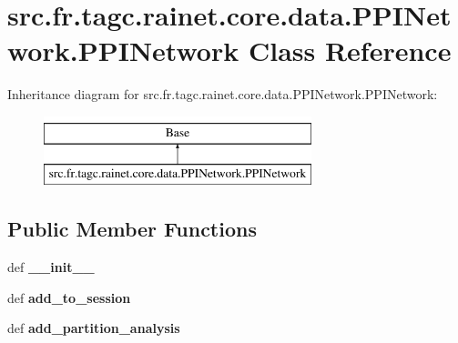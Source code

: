 \hypertarget{classsrc_1_1fr_1_1tagc_1_1rainet_1_1core_1_1data_1_1PPINetwork_1_1PPINetwork}{\section{src.\-fr.\-tagc.\-rainet.\-core.\-data.\-P\-P\-I\-Network.\-P\-P\-I\-Network Class Reference}
\label{classsrc_1_1fr_1_1tagc_1_1rainet_1_1core_1_1data_1_1PPINetwork_1_1PPINetwork}
}
Inheritance diagram for src.\-fr.\-tagc.\-rainet.\-core.\-data.\-P\-P\-I\-Network.\-P\-P\-I\-Network\-:\begin{figure}[H]
\begin{center}
\leavevmode
\includegraphics[height=2.000000cm]{classsrc_1_1fr_1_1tagc_1_1rainet_1_1core_1_1data_1_1PPINetwork_1_1PPINetwork}
\end{center}
\end{figure}
\subsection*{Public Member Functions}
\begin{DoxyCompactItemize}
\item 
\hypertarget{classsrc_1_1fr_1_1tagc_1_1rainet_1_1core_1_1data_1_1PPINetwork_1_1PPINetwork_ad16e66af14274e15cb1096a83fd7d6a4}{def {\bfseries \-\_\-\-\_\-init\-\_\-\-\_\-}}\label{classsrc_1_1fr_1_1tagc_1_1rainet_1_1core_1_1data_1_1PPINetwork_1_1PPINetwork_ad16e66af14274e15cb1096a83fd7d6a4}

\item 
\hypertarget{classsrc_1_1fr_1_1tagc_1_1rainet_1_1core_1_1data_1_1PPINetwork_1_1PPINetwork_a58a2ee66e3183442a570db585e540476}{def {\bfseries add\-\_\-to\-\_\-session}}\label{classsrc_1_1fr_1_1tagc_1_1rainet_1_1core_1_1data_1_1PPINetwork_1_1PPINetwork_a58a2ee66e3183442a570db585e540476}

\item 
\hypertarget{classsrc_1_1fr_1_1tagc_1_1rainet_1_1core_1_1data_1_1PPINetwork_1_1PPINetwork_aecc61d058cf57fab510b65b9f5a04d31}{def {\bfseries add\-\_\-partition\-\_\-analysis}}\label{classsrc_1_1fr_1_1tagc_1_1rainet_1_1core_1_1data_1_1PPINetwork_1_1PPINetwork_aecc61d058cf57fab510b65b9f5a04d31}

\end{DoxyCompactItemize}
